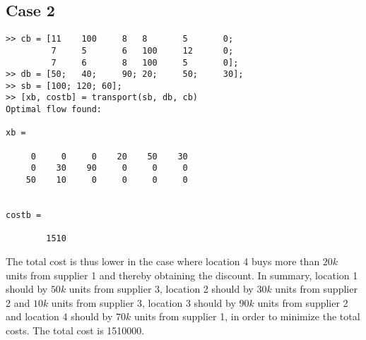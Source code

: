 \documentclass{article}
\begin{document}
  \subsection*{Case 2}
  \begin{lstlisting}
>> cb = [11    100     8   8       5       0; 
         7     5       6   100     12      0; 
         7     6       8   100     5       0];
>> db = [50;   40;     90; 20;     50;     30];
>> sb = [100; 120; 60];
>> [xb, costb] = transport(sb, db, cb)
Optimal flow found:

xb =

     0     0     0    20    50    30
     0    30    90     0     0     0
    50    10     0     0     0     0


costb =

        1510
  \end{lstlisting}

  \noindent
  The total cost is thus lower in the case where location 4 buys more than $20k$ units from supplier 1 and thereby obtaining the discount. In summary, location 1 should by $50k$ units from supplier 3, location 2 should by $30k$ units from supplier 2 and $10k$ units from supplier 3, location 3 should by $90k$ units from supplier 2 and location 4 should by $70k$ units from supplier 1, in order to minimize the total costs. The total cost is 1510000.
\end{document}
